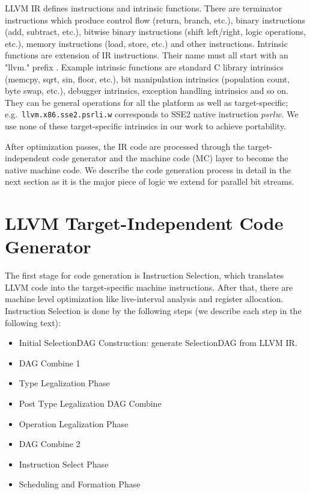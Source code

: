 LLVM IR defines instructions and intrinsic functions. There are terminator instructions which produce control flow (return, branch, etc.), binary instructions (add, subtract, etc.), bitwise binary instructions (shift left/right, logic operations, etc.), memory instructions (load, store, etc.) and other instructions. Intrinsic functions are extension of IR instructions. Their name must all start with an "llvm." prefix \cite{llvm_lang_ref}. Example intrinsic functions are standard C library intrinsics (memcpy, sqrt, sin, floor, etc.), bit manipulation intrinsics (population count, byte swap, etc.), debugger intrinsics, exception handling intrinsics and so on. They can be general operations for all the platform as well as target-specific; e.g.\ {\tt llvm.x86.sse2.psrli.w} corresponds to SSE2 native instruction $psrlw$. We use none of these target-specific intrinsics in our work to achieve portability.

After optimization passes, the IR code are processed through the target-independent code generator and the machine code (MC) layer to become the native machine code. We describe the code generation process in detail in the next section as it is the major piece of logic we extend for parallel bit streams.

\section{LLVM Target-Independent Code Generator}
The first stage for code generation is Instruction Selection, which translates LLVM code into the target-specific machine instructions. After that, there are machine level optimization like live-interval analysis and register allocation. Instruction Selection is done by the following steps \cite{llvm_code_gen} (we describe each step in the following text):

\begin{itemize}
  \item Initial SelectionDAG Construction: generate SelectionDAG from LLVM IR.
  \item DAG Combine 1
  \item Type Legalization Phase
  \item Post Type Legalization DAG Combine
  \item Operation Legalization Phase
  \item DAG Combine 2
  \item Instruction Select Phase
  \item Scheduling and Formation Phase
\end{itemize}

